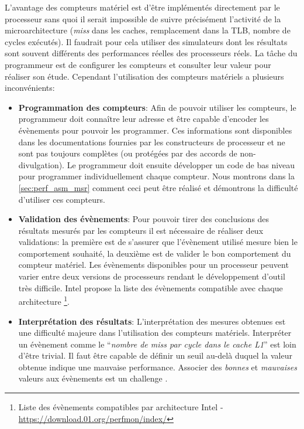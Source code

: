         L'avantage des compteurs matériel est d'être implémentés directement par le processeur sans quoi il serait impossible de suivre précisément l'activité de la microarchitecture (\textit{miss} dans les caches, remplacement dans la TLB, nombre de cycles exécutés). Il faudrait pour cela utiliser des simulateurs dont les résultats sont souvent différents des performances réelles des processeurs réels. La tâche du programmeur est de configurer les compteurs et consulter leur valeur pour réaliser son étude. Cependant l'utilisation des compteurs matériels a plusieurs inconvénients:
        \begin{itemize}
        
            \item \textbf{Programmation des compteurs}: Afin de pouvoir utiliser les compteurs, le programmeur doit connaître leur adresse et être capable d'encoder les évènements pour pouvoir les programmer. Ces informations sont disponibles dans les documentations fournies par les constructeurs de processeur et ne sont pas toujours complètes (ou protégées par des accords de non-divulgation). Le programmeur doit ensuite développer un code de bas niveau pour programmer individuellement chaque compteur. Nous montrons dans la \autoref{sec:perf_asm_msr} comment ceci peut être réalisé et démontrons la difficulté d'utiliser ces compteurs.
            
            \item \textbf{Validation des évènements}: Pour pouvoir tirer des conclusions des résultats mesurés par les compteurs il est nécessaire de réaliser deux validations: la première est de s'assurer que l'évènement utilisé mesure bien le comportement souhaité, la deuxième est de valider le bon comportement du compteur matériel. Les évènements disponibles pour un processeur peuvent varier entre deux versions de processeurs rendant le développement d'outil très difficile. Intel propose la liste des évènements compatible avec chaque architecture \footnote{Liste des évènements compatibles par architecture Intel - \url{https://download.01.org/perfmon/index/}}.
            
            \item \textbf{Interprétation des résultats}: L'interprétation des mesures obtenues est une difficulté majeure dans l'utilisation des compteurs matériels. Interpréter un évènement comme le ``\textit{nombre de miss par cycle dans le cache L1}'' est loin d'être trivial. Il faut être capable de définir un seuil au-delà duquel la valeur obtenue indique une mauvaise performance. Associer des \textit{bonnes} et \textit{mauvaises} valeurs aux évènements est un challenge \cite{Moseley2011}.
            
        \end{itemize}
        
